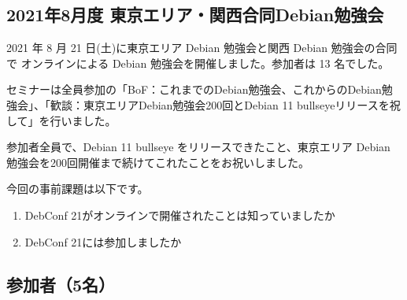 \documentclass[mingoth,a4paper]{jsarticle}
\begin{document}

\subsection{2021年8月度 東京エリア・関西合同Debian勉強会}

2021 年 8 月 21 日(土)に東京エリア Debian 勉強会と関西 Debian 勉強会の合同で
オンラインによる Debian 勉強会を開催しました。参加者は 13 名でした。

セミナーは全員参加の「BoF：これまでのDebian勉強会、これからのDebian勉強会」、「歓談：東京エリアDebian勉強会200回とDebian 11 bullseyeリリースを祝して」を行いました。

参加者全員で、Debian 11 bullseye をリリースできたこと、東京エリア Debian 勉強会を200回開催まで続けてこれたことをお祝いしました。



今回の事前課題は以下です。

\begin{enumerate}
  \item DebConf 21がオンラインで開催されたことは知っていましたか
  \item DebConf 21には参加しましたか
\end{enumerate}


\begin{multicols}{2}
{\small
  
}
\end{multicols}

%
%
%
% 





\subsection{参加者（5名）}
\end{document}
